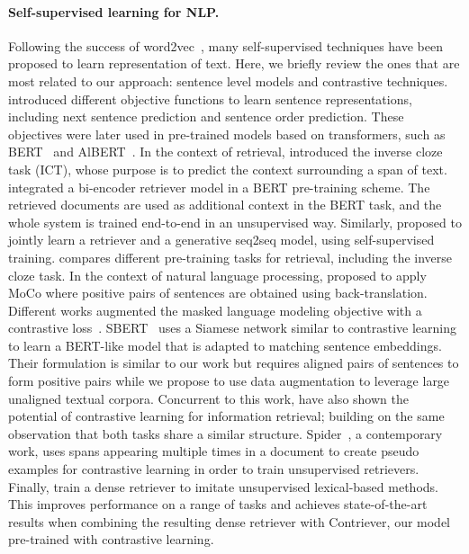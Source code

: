 \documentclass[10pt]{article} %
\newcommand{\sr}[1]{}
\def \ours          {Contriever}
\begin{document}
\paragraph{Self-supervised learning for NLP.}
Following the success of word2vec~\citep{mikolov2013distributed}, many self-supervised techniques have been proposed to learn representation of text.
Here, we briefly review the ones that are most related to our approach: sentence level models and contrastive techniques.
\citet{jernite2017discourse} introduced different objective functions to learn sentence representations, including next sentence prediction and sentence order prediction.
These objectives were later used in pre-trained models based on transformers, such as BERT~\citep{devlin2018bert} and AlBERT~\citep{lan2019albert}.
In the context of retrieval, \citet{lee2019latent} introduced the inverse cloze task (ICT), whose purpose is to predict the context surrounding a span of text.\sr{Given that you use ICT too, or at least discuss it prominently, as a reader I'd ask what's new here?}
\citet{guu2020realm} integrated a bi-encoder retriever model in a BERT pre-training scheme.
The retrieved documents are used as additional context in the BERT task, and the whole system is trained end-to-end in an unsupervised way.
Similarly, \citet{lewis2020pre} proposed to jointly learn a retriever and a generative seq2seq model, using self-supervised training.
\citet{chang2020pre} compares different pre-training tasks for retrieval, including the inverse cloze task.
In the context of natural language processing, \citet{fang2020cert} proposed to apply MoCo where positive pairs of sentences are obtained using back-translation.\sr{can you say why your approach would be better (here)? Also, at this point the reader doesn't know yet what kind of augmentation you propose so the delta is unclear}
Different works augmented the masked language modeling objective with a contrastive loss~\citep{giorgi2020declutr,wu2020clear,meng2021coco}.
SBERT~\citep{reimers2019sentence} uses a Siamese network similar to contrastive learning to learn a BERT-like model that is adapted to matching sentence embeddings. 
Their formulation is similar to our work but requires aligned pairs of sentences to form positive pairs while we propose to use data augmentation to leverage large unaligned textual corpora. 
Concurrent to this work, \citet{gao2021unsupervised} have also shown the potential of contrastive learning for information retrieval; building on the same observation that both tasks share a similar structure.
Spider~\citep{ram2021spider}, a contemporary work, uses spans appearing multiple times in a document to create pseudo examples for contrastive learning in order to train unsupervised retrievers.
Finally, \citet{chen2021salient} train a dense retriever to imitate unsupervised lexical-based methods. 
This improves performance on a range of tasks and achieves state-of-the-art results when combining the resulting dense retriever with \ours{}, our model pre-trained with contrastive learning.
\end{document}
